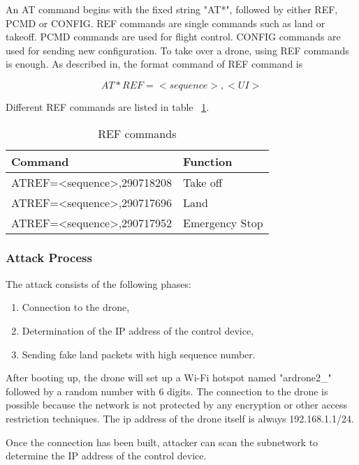 \documentclass{acm_proc_article-sp}
\begin{document}
An AT command begins with the fixed string "AT*", followed by either REF, PCMD or CONFIG. REF commands are single commands such as land or takeoff. PCMD commands are used for flight control. CONFIG commands are used for sending new configuration. To take over a drone, using REF commands is enough. As described in\cite{dev:guide}, the format command of REF command is 

\begin{equation}
  AT*REF=<sequence>,<UI>
\end{equation}


Different REF commands are listed in table ~\ref{refcom}.

\begin{table}
\centering
\caption{REF commands}
\label{refcom}
\begin{tabular}{@{}ll@{}} \hline
Command                                            & Function       \\ \hline
AT\*REF=\textless{}sequence\textgreater{},290718208 & Take off       \\ \hline
AT\*REF=\textless{}sequence\textgreater{},290717696 & Land           \\ \hline
AT\*REF=\textless{}sequence\textgreater{},290717952 & Emergency Stop \\ \hline
\end{tabular}
\end{table}


\subsubsection{Attack Process}

The attack consists of the following phases:

\begin{enumerate}
  \item Connection to the drone,
  \item Determination of the IP address of the control device,
  \item Sending fake land packets with high sequence number.
\end{enumerate}

After booting up, the drone will set up a Wi-Fi hotspot named "ardrone2\_" followed by a random number with 6 digits. The connection to the drone is possible because the network is not protected by any encryption or other access restriction techniques. The ip address of the drone itself is always 192.168.1.1/24.

Once the connection has been built, attacker can scan the subnetwork to determine the IP address of the control device.
\end{document}
